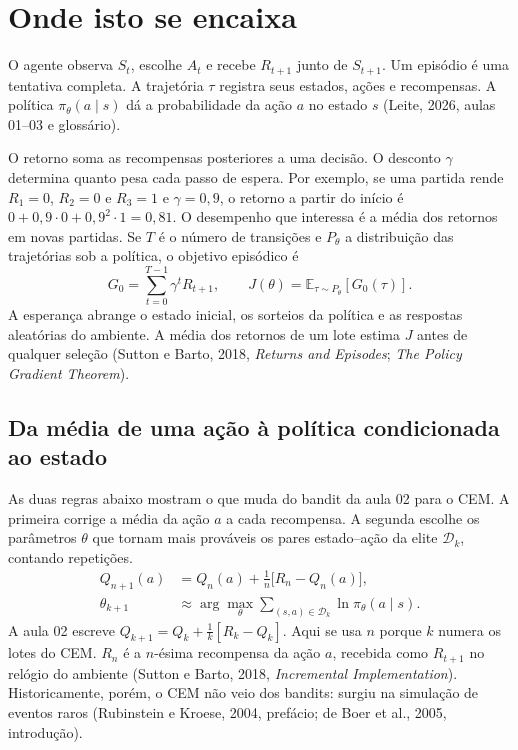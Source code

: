 \documentclass[12pt]{article}
\begin{document}
\section{Onde isto se encaixa}

O agente observa $S_t$, escolhe $A_t$ e recebe $R_{t+1}$ junto de $S_{t+1}$. Um episódio é uma tentativa completa. A trajetória $\tau$ registra seus estados, ações e recompensas. A política $\pi_\theta(a\mid s)$ dá a probabilidade da ação $a$ no estado $s$ (Leite, 2026, aulas 01--03 e glossário).

O retorno soma as recompensas posteriores a uma decisão. O desconto $\gamma$ determina quanto pesa cada passo de espera. Por exemplo, se uma partida rende $R_1=0$, $R_2=0$ e $R_3=1$ e $\gamma=0{,}9$, o retorno a partir do início é $0+0{,}9\cdot0+0{,}9^2\cdot1=0{,}81$. O desempenho que interessa é a média dos retornos em novas partidas. Se $T$ é o número de transições e $P_\theta$ a distribuição das trajetórias sob a política, o objetivo episódico é
\[
 G_0=\sum_{t=0}^{T-1}\gamma^t R_{t+1},\qquad J(\theta)=\mathbb E_{\tau\sim P_\theta}[G_0(\tau)].
\]
A esperança abrange o estado inicial, os sorteios da política e as respostas aleatórias do ambiente. A média dos retornos de um lote estima $J$ antes de qualquer seleção (Sutton e Barto, 2018, \emph{Returns and Episodes}; \emph{The Policy Gradient Theorem}).

\subsection{Da média de uma ação à política condicionada ao estado}

As duas regras abaixo mostram o que muda do bandit da aula 02 para o CEM. A primeira corrige a média da ação $a$ a cada recompensa. A segunda escolhe os parâmetros $\theta$ que tornam mais prováveis os pares estado--ação da elite $\mathcal D_k$, contando repetições.
\[
\begin{aligned}
 Q_{n+1}(a)&=Q_n(a)+\frac{1}{n}\big[R_n-Q_n(a)\big],\\
 \theta_{k+1}&\approx\arg\max_\theta\sum_{(s,a)\in\mathcal D_k}\ln\pi_\theta(a\mid s).
\end{aligned}
\]
A aula 02 escreve $Q_{k+1}=Q_k+\frac1k[R_k-Q_k]$. Aqui se usa $n$ porque $k$ numera os lotes do CEM. $R_n$ é a $n$-ésima recompensa da ação $a$, recebida como $R_{t+1}$ no relógio do ambiente (Sutton e Barto, 2018, \emph{Incremental Implementation}). Historicamente, porém, o CEM não veio dos bandits: surgiu na simulação de eventos raros (Rubinstein e Kroese, 2004, prefácio; de Boer et al., 2005, introdução).
\end{document}
